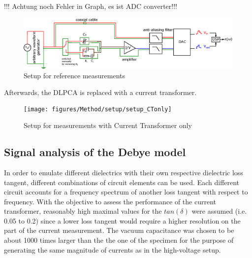 !!! Achtung noch Fehler in Graph, es ist ADC converter!!!
\begin{figure}[htbp]
	\centering
	\includegraphics[width=\textwidth]{figures/Method/setup/setup_DLPCA.eps}		
	\caption[Kurze Abbildungsbeschreibung]{Setup for reference measurements \protect\footnotemark} 
	
	\label{sec.setup_amplifier}

\end{figure}


Afterwards, the DLPCA is replaced with a current transformer. 
\begin{figure}[htbp]
	\centering
	\texttt{[image: figures/Method/setup/setup\_CTonly]}		
	\caption[Kurze Abbildungsbeschreibung]{Setup for measurements with Current Transformer only \protect\footnotemark}
	\label{sec.setup}

\end{figure}

\subsection{Signal analysis of the Debye model}

In order to emulate different dielectrics with their own respective dielectric loss tangent, different combinations of circuit elements can be used.
Each different circuit accounts for a frequency spectrum of another loss tangent with respect to frequency. With the objective to assess the performance of the current transformer, reasonably high maximal values for the $tan\left(\delta\right)$ were assumed (i.e. 0.05 to 0.2) since a lower loss tangent
would require a higher resolution on the part of the current measurement. The vacuum capacitance was chosen to be about 1000 times larger than
the the one of the specimen for the purpose of generating the same magnitude of currents as in the high-voltage setup.


